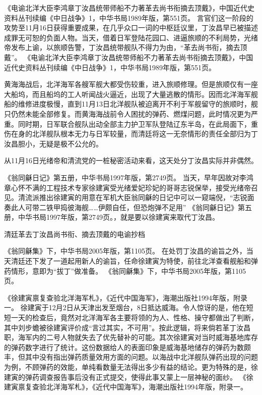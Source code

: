 \documentclass[12pt,UTF8]{ctexbook}
\begin{document}
《电谕北洋大臣李鸿章丁汝昌统带师船不力著革去尚书衔摘去顶戴》，中国近代史资料丛刊续编《中日战争》1，中华书局1989年版，第551页。
言官们这一阶段的攻势至11月16日获得重要成果，在几乎众口一词的中枢廷议里，丁汝昌早已被描述成罪无可恕的负面人物。当天，借着日军登陆花园口、进逼旅顺的不利局势，光绪帝发布上谕，以旅顺告警，丁汝昌统带舰队不得力为由，“革去尚书衔，摘去顶戴”。 《电谕北洋大臣李鸿章丁汝昌统带师船不力著革去尚书衔摘去顶戴》，中国近代史资料丛刊续编《中日战争》1，中华书局1989年版，第551页。

黄海海战后，北洋海军各艘军舰大都受伤较重，进入旅顺修理。但是旅顺仅有一座大船坞，而且船坞的工人听闻战火逼近，出现了大量逃散的情形。因而北洋海军舰船的维修进度极慢，直到11月13日北洋舰队被迫离开不利于军舰留守的旅顺时，舰只仍然未能全部修复。而黄海海战前令人困扰的弹药、燃煤问题，此时情况更为严重。同时期，日军联合舰队出动全部主力护卫军队登陆辽东半岛，在此局面下，重伤在身的北洋舰队根本无力与日军较量，而清廷将这一无奈情形的责任全部归为丁汝昌胆小，无疑是极不公允的。

从11月16日光绪帝和清流党的一桩秘密活动来看，这天处分丁汝昌实际并非偶然。

《翁同龢日记》第五册，中华书局1997年版，第2749页。
当天，早年因故对李鸿章心怀不满的工程技术专家徐建寅受光绪爱妃珍妃的哥哥志锐保举，接受光绪帝召见。清流派推出徐建寅的用意在军机大臣翁同龢的日记中可以一窥端倪，“志锐面奏此人可带二铁甲捣彼海舰……伊颇自任，但恐炮弹不足用” 《翁同龢日记》第五册，中华书局1997年版，第2749页。，就是要以徐建寅来取代丁汝昌。


清廷革去丁汝昌尚书衔、摘去顶戴的电谕抄档

《翁同龢集》下，中华书局2005年版，第1105页。
在处罚丁汝昌的谕旨之外，当天清廷还下发了一道起用新人的谕旨，任命徐建寅为特使，前往北洋查看舰船和弹药情形，意即为“拔丁”做准备。 《翁同龢集》下，中华书局2005年版，第1105页。

《徐建寅禀复查验北洋海军札》，《近代中国海军》，海潮出版社1994年版，附录一。
徐建寅于12月2日从天津出发至烟台，8日抵达威海。令人惊讶的是，他在短短一天的检查后，竟然对北洋海军各主要将领的为人、性格、操守都做出了判断，其中刘步蟾被徐建寅评价成“言过其实，不可用”。按此逻辑，将来倘若革丁汝昌职，海军内的二号人物就失去了优先替补的可能。其次徐建寅对当时威海基地库存的弹药数字进行了统计。这份数据给人的表面印象是威海基地储存的弹药为数颇丰，但其中没有指出弹药质量效用方面的问题。以海战中北洋舰队弹药出现的问题为例，不顾弹药的效能，单纯看数量无法得出多少有益的结论。更为特殊的是，徐建寅的弹药调查报告事后没有正式提交，使得此事又蒙上一层神秘的面纱。 《徐建寅禀复查验北洋海军札》，《近代中国海军》，海潮出版社1994年版，附录一。
\end{document}
